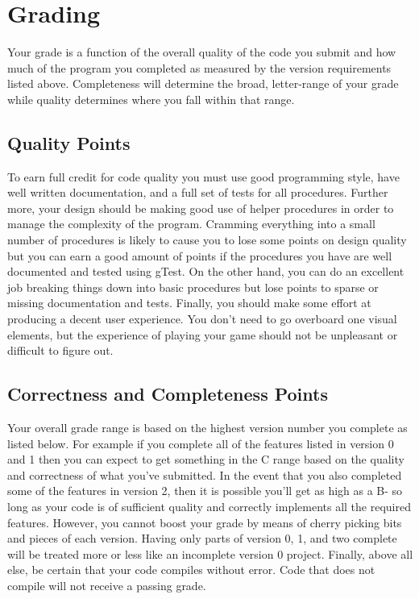 \documentclass[]{tufte-handout}
\begin{document}
\section{Grading}

Your grade is a function of the overall quality of the code you submit and how much of the
program you completed as measured by the version requirements listed above. Completeness
will determine the broad, letter-range of your grade while quality determines where
you fall within that range.

\subsection{Quality Points}

To earn full credit for code quality you must use good programming style, have well written documentation, and a full set of tests for all procedures. Further more, your design should be making good use of helper procedures in order to manage the complexity of the program. Cramming everything into a small number of procedures is likely to cause you to lose some points on design quality but you can earn a good amount of points if the procedures you have are well documented and tested using gTest. On the other hand, you can do an excellent job breaking things down into basic procedures but lose points to sparse or missing documentation and tests. Finally, you should make some effort at producing a decent user experience.  You don't need to go overboard one visual elements, but the
experience of playing your game should not be unpleasant or difficult to figure out.

\subsection{Correctness and Completeness Points}

Your overall grade range is based on the highest version number you complete as listed below. For example
if you complete all of the features listed in version 0 and 1 then you can expect
to get something in the C range based on the quality and correctness of what you've
submitted. In the event that you also completed some of the features in version 2, then
it is possible you'll get as high as a B- so long as your code is of sufficient quality and
correctly implements all the required features.  However, you cannot boost your grade by
means of cherry picking bits and pieces of each version.  Having only parts of version
0, 1, and two complete will be treated more or less like an incomplete version 0 project. 
Finally, above all else, be certain that your code compiles without error. Code that
does not compile will not receive a passing grade.
\end{document}
